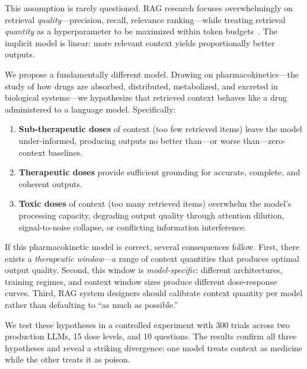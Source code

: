 \documentclass[11pt,a4paper]{article}
\begin{document}
This assumption is rarely questioned. RAG research focuses overwhelmingly on retrieval \emph{quality}---precision, recall, relevance ranking---while treating retrieval \emph{quantity} as a hyperparameter to be maximized within token budgets~\citep{gao2023ragsurvey}. The implicit model is linear: more relevant context yields proportionally better outputs.

We propose a fundamentally different model. Drawing on pharmacokinetics---the study of how drugs are absorbed, distributed, metabolized, and excreted in biological systems---we hypothesize that retrieved context behaves like a drug administered to a language model. Specifically:

\begin{enumerate}[leftmargin=*, itemsep=2pt]
  \item \textbf{Sub-therapeutic doses} of context (too few retrieved items) leave the model under-informed, producing outputs no better than---or worse than---zero-context baselines.
  \item \textbf{Therapeutic doses} provide sufficient grounding for accurate, complete, and coherent outputs.
  \item \textbf{Toxic doses} of context (too many retrieved items) overwhelm the model's processing capacity, degrading output quality through attention dilution, signal-to-noise collapse, or conflicting information interference.
\end{enumerate}

If this pharmacokinetic model is correct, several consequences follow. First, there exists a \emph{therapeutic window}---a range of context quantities that produces optimal output quality. Second, this window is \emph{model-specific}: different architectures, training regimes, and context window sizes produce different dose-response curves. Third, RAG system designers should calibrate context quantity per model rather than defaulting to ``as much as possible.''

We test these hypotheses in a controlled experiment with 300 trials across two production LLMs, 15 dose levels, and 10 questions. The results confirm all three hypotheses and reveal a striking divergence: one model treats context as medicine while the other treats it as poison.
\end{document}
